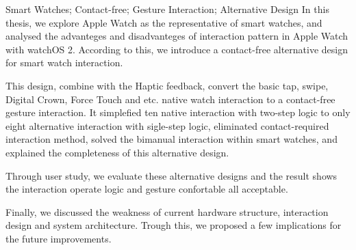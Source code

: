 
\begin{abstract}{智能手表；非接触式；手势交互；备择设计}


本文以现有智能手表产品的代表 Apple Watch 为例，对 Apple Watch 上的交互模式的优缺点进行了全面的分析，并据此给出了一套非接触式的备择设计。其配合了 Haptic Engine 对用户的直观震动反馈，完成了对基础点按、滑动、Digital Crown、Force Touch等系列原生交互的非接触式手势交互设计，此设计将嵌套两步逻辑的十种原生交互简化为了单步逻辑上的八种备择交互，且消除了接触式交互的依赖，解决了现有交互中对双手依赖的缺陷，并同时说明了给出的备择设计的交互完备性。通过用户调研，对本套交互方式的设计进行了评估，结果显示该方案的操作逻辑和舒适度良好。在最后，本文对设计的硬件结构、交互方式和系统架构的现有缺陷进行了讨论，并从中得到的启示，给出了可行的解决思路。
\end{abstract}
\cleardoublepage
{} %
\begin{abstractEng}{Smart Watches; Contact-free; Gesture Interaction; Alternative Design}
In this thesis, we explore Apple Watch as the representative of smart watches, and analysed the advanteges and disadvanteges of interaction pattern in Apple Watch with watchOS 2. According to this, we introduce a contact-free alternative design for smart watch interaction.

This design, combine with the Haptic feedback, convert the basic tap, swipe, Digital Crown, Force Touch and etc. native watch interaction to a contact-free gesture interaction. It simplefied ten native interaction with two-step logic to only eight alternative interaction with sigle-step logic, eliminated contact-required interaction method, solved the bimanual interaction within smart watches, and explained the completeness of this alternative design.

Through user study, we evaluate these alternative designs and the result shows  the interaction operate logic and gesture confortable all acceptable.

Finally, we discussed the weakness of current hardware structure, interaction design and system architecture. Trough this, we proposed a few implications for the future improvements.
\end{abstractEng}
